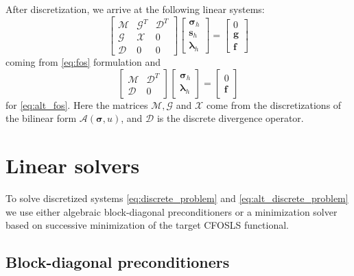 \documentclass[a4paper,12pt]{amsart}
\numberwithin{equation}{section}
\def\bff{{\mathbf f}}
\def\bg{{\mathbf g}}
\def\bs{{\mathbf s}}
\def\blambda{{\boldsymbol \lambda}}
\newcommand{\A}{{\mathcal A}}
\newcommand{\D}{{\mathcal D}}
\newcommand{\G}{{\mathcal G}}
\newcommand{\M}{{\mathcal M}}
\newcommand{\X}{{\mathcal X}}
\def\bsigma{{\boldsymbol \sigma}}
\begin{document}
After discretization, we arrive at the following linear systems:
\begin{equation}
\begin{bmatrix}
\M & \G^T & \D^T \\
\G & \X & 0 \\
\D & 0 & 0 
\end{bmatrix}
\begin{bmatrix}
\bsigma_h \\
\bs_h \\
\blambda_h
\end{bmatrix}
=
\begin{bmatrix}
0 \\
\bg \\
\bff
\end{bmatrix}
\label{eq:discrete_problem}
\end{equation}
coming from \eqref{eq:fos} formulation and
\begin{equation}
\begin{bmatrix}
\M & \D^T \\
\D & 0 
\end{bmatrix}
\begin{bmatrix}
\bsigma_h \\
\blambda_h
\end{bmatrix}
=
\begin{bmatrix}
0 \\
\bff
\end{bmatrix}
\label{eq:alt_discrete_problem}
\end{equation}
for \eqref{eq:alt_fos}. Here the matrices $\M, \G$ and $\X$ come from the discretizations of the bilinear form $\A(\bsigma,u)$, and $\D$ is the discrete divergence operator.

\section{Linear solvers}

To solve discretized systems \eqref{eq:discrete_problem} and \eqref{eq:alt_discrete_problem} we use either algebraic block-diagonal preconditioners or a minimization solver based on successive minimization of the target CFOSLS functional.

\subsection{Block-diagonal preconditioners} 
\label{sec:blkdiag}
\end{document}
